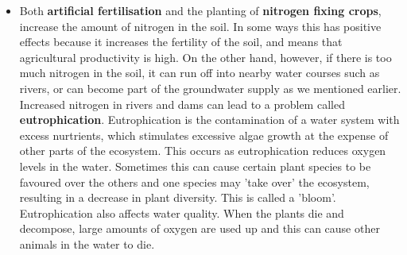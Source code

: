 \begin{itemize}
\item{Both \textbf{artificial fertilisation} and the planting of \textbf{nitrogen fixing crops}, increase the amount of nitrogen in the soil. In some ways this has positive effects because it increases the fertility of the soil, and means that agricultural productivity is high. On the other hand, however, if there is too much nitrogen in the soil, it can run off into nearby water courses such as rivers, or can become part of the groundwater supply as we mentioned earlier. Increased nitrogen in rivers and dams can lead to a problem called \textbf{eutrophication}. Eutrophication is the contamination of a water system with excess nurtrients, which stimulates excessive algae growth at the expense of other parts of the ecosystem.  This occurs as eutrophication reduces oxygen levels in the water. Sometimes this can cause certain plant species to be favoured over the others and one species may 'take over' the ecosystem, resulting in a decrease in plant diversity. This is called a 'bloom'. Eutrophication also affects water quality. When the plants die and decompose, large amounts of oxygen are used up and this can cause other animals in the water to die.

}
\end{itemize}
